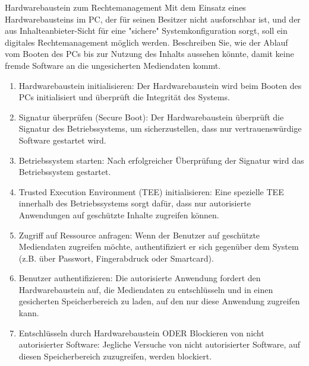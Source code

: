\documentclass{article}
\begin{document}
\begin{exercise}{Hardwarebaustein zum Rechtemanagement}
  Mit dem Einsatz eines Hardwarebausteins im PC, der für seinen Besitzer nicht ausforschbar ist, und der aus Inhalteanbieter-Sicht für eine "sichere" Systemkonfiguration sorgt, soll ein digitales Rechtemanagement möglich werden. Beschreiben Sie, wie der Ablauf vom Booten des PCs bis zur Nutzung des Inhalts aussehen könnte, damit keine fremde Software an die ungesicherten Mediendaten kommt.

  \begin{solution}
    \begin{enumerate}
      \item Hardwarebaustein initialisieren: Der Hardwarebaustein wird beim Booten des PCs initialisiert und überprüft die Integrität des Systems.
      \item Signatur überprüfen (Secure Boot): Der Hardwarebaustein überprüft die Signatur des Betriebssystems, um sicherzustellen, dass nur vertrauenswürdige Software gestartet wird.
      \item Betriebssystem starten: Nach erfolgreicher Überprüfung der Signatur wird das Betriebssystem gestartet.
      \item Trusted Execution Environment (TEE) initialisieren: Eine spezielle TEE innerhalb des Betriebssystems sorgt dafür, dass nur autorisierte Anwendungen auf geschützte Inhalte zugreifen können.
      \item Zugriff auf Ressource anfragen: Wenn der Benutzer auf geschützte Mediendaten zugreifen möchte, authentifiziert er sich gegenüber dem System (z.B. über Passwort, Fingerabdruck oder Smartcard).
      \item Benutzer authentifizieren: Die autorisierte Anwendung fordert den Hardwarebaustein auf, die Mediendaten zu entschlüsseln und in einen gesicherten Speicherbereich zu laden, auf den nur diese Anwendung zugreifen kann.
      \item Entschlüsseln durch Hardwarebaustein ODER Blockieren von nicht autorisierter Software: Jegliche Versuche von nicht autorisierter Software, auf diesen Speicherbereich zuzugreifen, werden blockiert.
    \end{enumerate}
  \end{solution}
\end{exercise}
\end{document}
